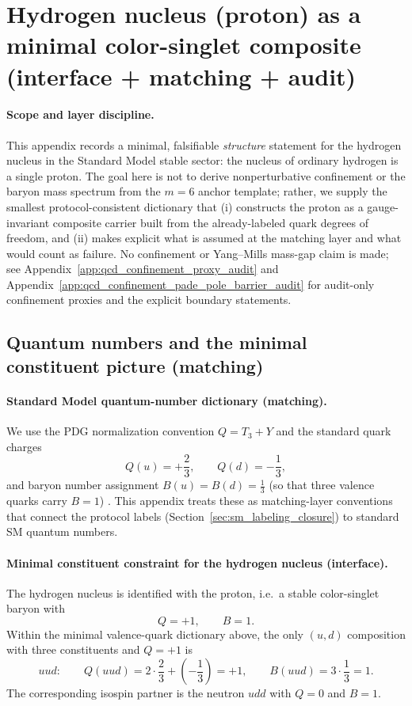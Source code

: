 \section{Hydrogen nucleus (proton) as a minimal color-singlet composite (interface + matching + audit)}
\label{app:proton_hydrogen_nucleus_interface}

\paragraph{Scope and layer discipline.}
\InterfaceTag This appendix records a minimal, falsifiable \emph{structure} statement for the hydrogen nucleus in the Standard Model stable sector: the nucleus of ordinary hydrogen is a single proton.
The goal here is not to derive nonperturbative confinement or the baryon mass spectrum from the $m=6$ anchor template; rather, we supply the smallest protocol-consistent dictionary that (i) constructs the proton as a gauge-invariant composite carrier built from the already-labeled quark degrees of freedom, and (ii) makes explicit what is assumed at the matching layer and what would count as failure.
\AuditTag No confinement or Yang--Mills mass-gap claim is made; see Appendix~\ref{app:qcd_confinement_proxy_audit} and Appendix~\ref{app:qcd_confinement_pade_pole_barrier_audit} for audit-only confinement proxies and the explicit boundary statements.

\subsection{Quantum numbers and the minimal constituent picture (matching)}
\paragraph{Standard Model quantum-number dictionary (matching).}
\MatchTag We use the PDG normalization convention $Q=T_3+Y$ and the standard quark charges
\[
Q(u)=+\frac{2}{3},\qquad Q(d)=-\frac{1}{3},
\]
and baryon number assignment $B(u)=B(d)=\frac{1}{3}$ (so that three valence quarks carry $B=1$) \cite{PDGRPP2024,PeskinSchroeder1995}.
This appendix treats these as matching-layer conventions that connect the protocol labels (Section~\ref{sec:sm_labeling_closure}) to standard SM quantum numbers.

\paragraph{Minimal constituent constraint for the hydrogen nucleus (interface).}
\InterfaceTag The hydrogen nucleus is identified with the proton, i.e.\ a stable color-singlet baryon with
\[
Q=+1,\qquad B=1.
\]
Within the minimal valence-quark dictionary above, the only $(u,d)$ composition with three constituents and $Q=+1$ is
\[
uud:\qquad Q(uud)=2\cdot\frac{2}{3}+\left(-\frac{1}{3}\right)=+1,\qquad B(uud)=3\cdot\frac{1}{3}=1.
\]
The corresponding isospin partner is the neutron $udd$ with $Q=0$ and $B=1$.

